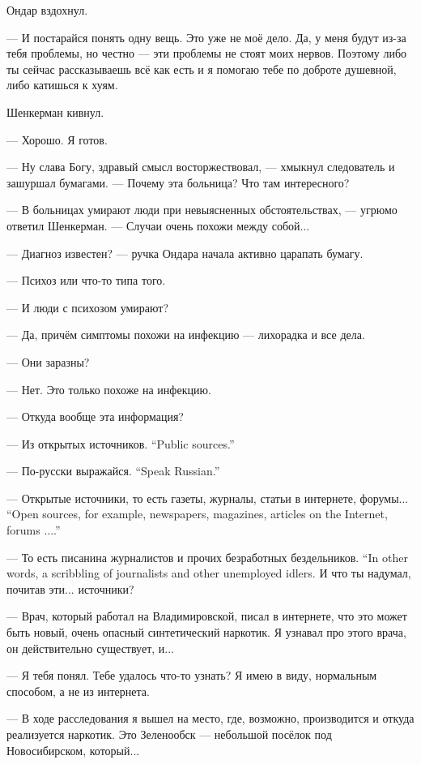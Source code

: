 Ондар вздохнул.

--- И постарайся понять одну вещь.
Это уже не моё дело.
Да, у меня будут из-за тебя проблемы, но честно --- эти проблемы не стоят моих нервов.
Поэтому либо ты сейчас рассказываешь всё как есть и я помогаю тебе по доброте душевной, либо катишься к хуям.

Шенкерман кивнул.

--- Хорошо.
Я готов.

--- Ну слава Богу, здравый смысл восторжествовал, --- хмыкнул следователь и зашуршал бумагами.
--- Почему эта больница?
Что там интересного?

--- В больницах умирают люди при невыясненных обстоятельствах, --- угрюмо ответил Шенкерман.
--- Случаи очень похожи между собой...

--- Диагноз известен? --- ручка Ондара начала активно царапать бумагу.

--- Психоз или что-то типа того.

--- И люди с психозом умирают?

--- Да, причём симптомы похожи на инфекцию --- лихорадка и все дела.

--- Они заразны?

--- Нет.
Это только похоже на инфекцию.

--- Откуда вообще эта информация?

{--- Из открытых источников.}
{``Public sources.''}

{--- По-русски выражайся.}
{``Speak Russian.''}

{--- Открытые источники, то есть газеты, журналы, статьи в интернете, форумы...}
{``Open sources, for example, newspapers, magazines, articles on the Internet, forums ....''}

{--- То есть писанина журналистов и прочих безработных бездельников.}
{``In other words, a scribbling of journalists and other unemployed idlers.}
И что ты надумал, почитав эти... источники?

--- Врач, который работал на Владимировской, писал в интернете, что это может быть новый, очень опасный синтетический наркотик.
Я узнавал про этого врача, он действительно существует, и...

--- Я тебя понял.
Тебе удалось что-то узнать?
Я имею в виду, нормальным способом, а не из интернета.

--- В ходе расследования я вышел на место, где, возможно, производится и откуда реализуется наркотик.
Это Зеленообск --- небольшой посёлок под Новосибирском, который...

